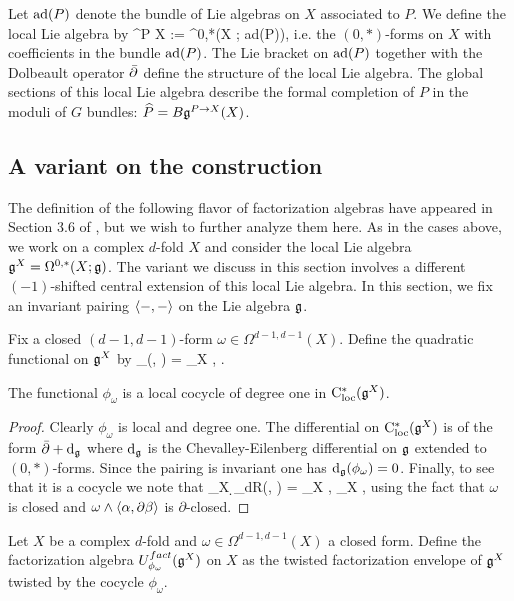 \documentclass[10pt]{amsart}
\begin{document}
Let ${\rm ad}(P)$ denote the bundle of Lie algebras on $X$ associated to $P$. We define the local Lie algebra by
\ben
\fg^{P \to X} := \Omega^{0,*}(X ; {\rm ad}(P)),
\een 
i.e. the $(0,*)$-forms on $X$ with coefficients in the bundle ${\rm ad}(P)$. The Lie bracket on ${\rm ad}(P)$ together with the Dolbeault operator $\Bar{\partial}$ define the structure of the local Lie algebra. The global sections of this local Lie algebra describe the formal completion of $P$ in the moduli of $G$ bundles: $\widehat{P} = B \mathfrak g^{P \to X}(X)$. 

\subsection{A variant on the construction}

The definition of the following flavor of factorization algebras have appeared in Section 3.6 of \cite{book1}, but we wish to further analyze them here. As in the cases above, we work on a complex $d$-fold $X$ and consider the local Lie algebra $\mathfrak g^X = \Omega^{0,*}(X; \mathfrak g)$. The variant we discuss in this section involves a different $(-1)$-shifted central extension of this local Lie algebra. In this section, we fix an invariant pairing $\langle-,-\rangle$ on the Lie algebra $\mathfrak g$. 

Fix a closed $(d-1,d-1)$-form $\omega \in \Omega^{d-1,d-1}(X)$. Define the quadratic functional on $\mathfrak g^X$ by
\ben
\phi_\omega (\alpha , \beta) = \int_X \omega \wedge \<\alpha, \partial \beta\> .
\een

\begin{lem} The functional $\phi_\omega$ is a local cocycle of degree one in ${\rm C}_{\rm loc}^*(\mathfrak g^X)$. 
\end{lem}
\begin{proof} Clearly $\phi_\omega$ is local and degree one. The differential on ${\rm C}_{\rm loc}^*(\mathfrak g^X)$ is of the form $\Bar{\partial} + {\rm d}_{\mathfrak g}$ where ${\rm d}_\mathfrak g$ is the Chevalley-Eilenberg differential on $\mathfrak g$ extended to $(0,*)$-forms. Since the pairing is invariant one has ${\rm d}_\mathfrak g(\phi_\omega) = 0$. Finally, to see that it is a cocycle we note that
\ben
\int_X \d_{dR}(\omega \wedge \<\alpha, \partial \beta\>) = \int_X \omega \wedge \<\dbar \alpha, \partial \beta\> \pm \int_X \omega \wedge \<\alpha, \dbar \partial \beta\>
\een
using the fact that $\omega$ is closed and $\omega \wedge \langle\alpha, \partial \beta\rangle$ is $\partial$-closed. 
\end{proof}

\begin{dfn} Let $X$ be a complex $d$-fold and $\omega \in \Omega^{d-1,d-1}(X)$ a closed form. Define the factorization algebra $U^{fact}_{\phi_\omega}(\mathfrak g^X)$ on $X$ as the twisted factorization envelope of $\mathfrak g^X$ twisted by the cocycle $\phi_\omega$. 
\end{dfn}
\end{document}
